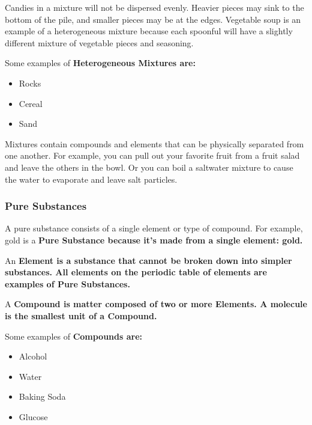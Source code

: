 \begin{definition}[Heterogeneous]
    Candies in a mixture will not be dispersed evenly. Heavier pieces may sink
    to the bottom of the pile, and smaller pieces may be at the edges.
    Vegetable soup is an example of a heterogeneous mixture because each
    spoonful will have a slightly different mixture of vegetable pieces and
    seasoning.
    
    Some examples of \bf{Heterogeneous Mixtures} are:
    
    \begin{itemize}
        \item Rocks
        \item Cereal
        \item Sand
    \end{itemize}
\end{definition}

\begin{definition}
    Mixtures contain compounds and elements that can be physically separated
    from one another. For example, you can pull out your favorite fruit from a
    fruit salad and leave the others in the bowl. Or you can boil a saltwater
    mixture to cause the water to evaporate and leave salt particles.
\end{definition}

\subsubsection*{Pure Substances}

A pure substance consists of a single element or type of compound. For example,
gold is a \bf{Pure Substance} because it's made from a single element:
gold.

\begin{definition}[Elements]
    An \bf{Element} is a substance that cannot be broken down into simpler
    substances. All elements on the periodic table of elements are examples of
    \bf{Pure Substances}.
\end{definition}

\begin{definition}[Compounds]
    A \bf{Compound} is matter composed of two or more \bf{Elements}. A
    molecule is the smallest unit of a \bf{Compound}. 

    Some examples of \bf{Compounds} are:
    
    \begin{itemize}
        \item Alcohol
        \item Water
        \item Baking Soda
        \item Glucose
    \end{itemize}
\end{definition}

